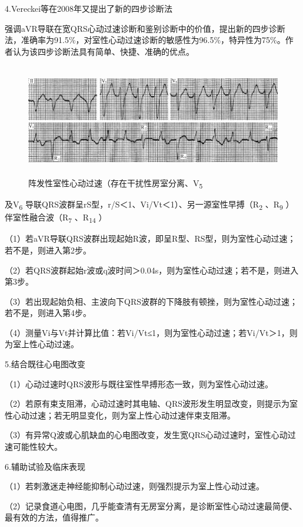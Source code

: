 4.Vereckei等在2008年又提出了新的四步诊断法

强调aVR导联在宽QRS心动过速诊断和鉴别诊断中的价值，提出新的四步诊断法，准确率为91.5\%，对室性心动过速诊断的敏感性为96.5\%，特异性为75\%。作者认为该四步诊断法具有简单、快捷、准确的优点。

\begin{figure}[!htbp]
 \centering
 \includegraphics[width=5.78125in,height=1.92708in]{./images/Image00516.jpg}
 \captionsetup{justification=centering}
 \caption{阵发性室性心动过速（存在干扰性房室分离、V\textsubscript{5}}
 \label{fig31-13}
  \end{figure} 
及V\textsubscript{6}
导联QRS波群呈rS型，r/S＜1、Vi/Vt＜1）、另一源室性早搏（R\textsubscript{2}
、R\textsubscript{9} ）伴室性融合波（R\textsubscript{7}
、R\textsubscript{14} ）

（1）若aVR导联QRS波群出现起始R波，即呈R型、RS型，则为室性心动过速；若不是，则进入第2步。

（2）若QRS波群起始r波或q波时间＞0.04s，则为室性心动过速；若不是，则进入第3步。

（3）若出现起始负相、主波向下QRS波群的下降肢有顿挫，则为室性心动过速；若不是，则进入第4步。

（4）测量Vi与Vt并计算比值：若Vi/Vt≤1，则为室性心动过速；若Vi/Vt＞1，则为室上性心动过速。

5.结合既往心电图改变

（1）心动过速时QRS波形与既往室性早搏形态一致，则为室性心动过速。

（2）若原有束支阻滞，心动过速时其电轴、QRS波形发生明显改变，则提示为室性心动过速；若无明显变化，则为室上性心动过速伴束支阻滞。

（3）有异常Q波或心肌缺血的心电图改变，发生宽QRS心动过速时，室性心动过速可能性较大。

6.辅助试验及临床表现

（1）若刺激迷走神经能抑制心动过速，则强烈提示为室上性心动过速。

（2）记录食道心电图，几乎能查清有无房室分离，是诊断室性心动过速最简便、最有效的方法，值得推广。

